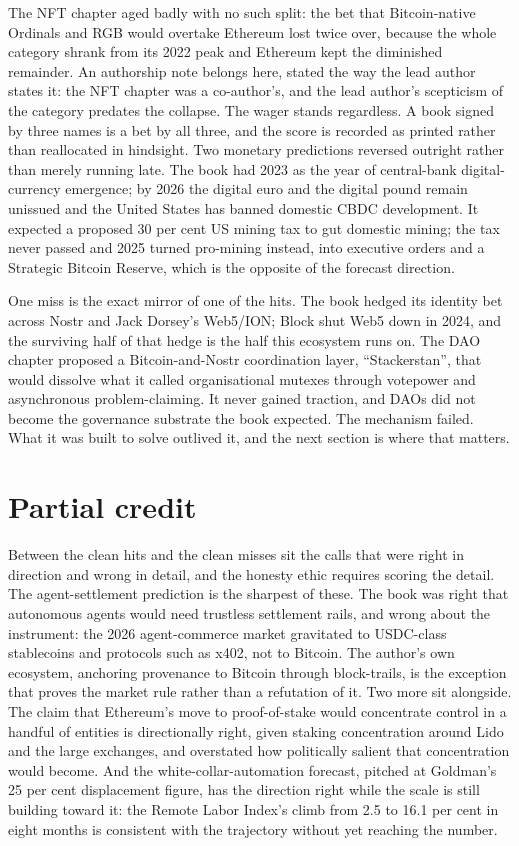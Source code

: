 The NFT chapter aged badly with no such split: the bet that Bitcoin-native Ordinals and RGB would overtake Ethereum lost twice over, because the whole category shrank from its 2022 peak and Ethereum kept the diminished remainder. An authorship note belongs here, stated the way the lead author states it: the NFT chapter was a co-author's, and the lead author's scepticism of the category predates the collapse. The wager stands regardless. A book signed by three names is a bet by all three, and the score is recorded as printed rather than reallocated in hindsight. Two monetary predictions reversed outright rather than merely running late. The book had 2023 as the year of central-bank digital-currency emergence; by 2026 the digital euro and the digital pound remain unissued and the United States has banned domestic CBDC development. It expected a proposed 30 per cent US mining tax to gut domestic mining; the tax never passed and 2025 turned pro-mining instead, into executive orders and a Strategic Bitcoin Reserve, which is the opposite of the forecast direction.

One miss is the exact mirror of one of the hits. The book hedged its identity bet across Nostr and Jack Dorsey's Web5/ION; Block shut Web5 down in 2024, and the surviving half of that hedge is the half this ecosystem runs on. The DAO chapter proposed a Bitcoin-and-Nostr coordination layer, ``Stackerstan'', that would dissolve what it called organisational mutexes through votepower and asynchronous problem-claiming. It never gained traction, and DAOs did not become the governance substrate the book expected. The mechanism failed. What it was built to solve outlived it, and the next section is where that matters.

\section{Partial credit}

Between the clean hits and the clean misses sit the calls that were right in direction and wrong in detail, and the honesty ethic requires scoring the detail. The agent-settlement prediction is the sharpest of these. The book was right that autonomous agents would need trustless settlement rails, and wrong about the instrument: the 2026 agent-commerce market gravitated to USDC-class stablecoins and protocols such as x402, not to Bitcoin. The author's own ecosystem, anchoring provenance to Bitcoin through block-trails, is the exception that proves the market rule rather than a refutation of it. Two more sit alongside. The claim that Ethereum's move to proof-of-stake would concentrate control in a handful of entities is directionally right, given staking concentration around Lido and the large exchanges, and overstated how politically salient that concentration would become. And the white-collar-automation forecast, pitched at Goldman's 25 per cent displacement figure, has the direction right while the scale is still building toward it: the Remote Labor Index's climb from 2.5 to 16.1 per cent in eight months is consistent with the trajectory without yet reaching the number.

